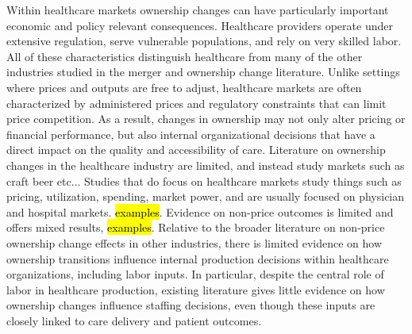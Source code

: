\documentclass[preprint,authoryear]{elsarticle}
\begin{document}
Within healthcare markets ownership changes can have particularly important economic and policy relevant consequences. Healthcare providers operate under extensive regulation, serve vulnerable populations, and rely on very skilled labor. All of these characteristics distinguish healthcare from many of the other industries studied in the merger and ownership change literature. Unlike settings where prices and outputs are free to adjust, healthcare markets are often characterized by administered prices and regulatory constraints that can limit price competition. As a result, changes in ownership may not only alter pricing or financial performance, but also internal organizational decisions that have a direct impact on the quality and accessibility of care. Literature on ownership changes in the healthcare industry are limited, and instead study markets such as craft beer \citep{fan_yang_2022} etc... Studies that do focus on healthcare markets study things such as pricing, utilization, spending, market power, and are usually focused on physician and hospital markets. \hl{examples}. Evidence on non-price outcomes is limited and offers mixed results, \hl{examples}. Relative to the broader literature on non-price ownership change effects in other industries, there is limited evidence on how ownership transitions influence internal production decisions within healthcare organizations, including labor inputs. In particular, despite the central role of labor in healthcare production, existing literature gives little evidence on how ownership changes influence staffing decisions, even though these inputs are closely linked to care delivery and patient outcomes. \\
\end{document}
